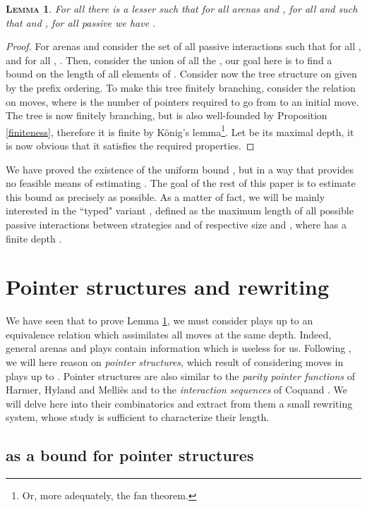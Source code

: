 \documentclass{article}
\newtheorem{lemma}{\textsc{Lemma}}
\begin{document}
\begin{lemma}
For all  there is a lesser  such that for all arenas  and , for all  and  such that
 and , for all passive  we have .
\label{konig}
\end{lemma}
\begin{proof}
For arenas  and  consider the set  of all passive interactions  such that for all ,
 and for all , . Then, consider the union  of all the , our goal
here is to find a bound on the length of all elements of . Consider now the tree structure on  given by the prefix ordering.
To make this tree finitely branching, consider the relation  on moves, where  is the number of pointers required
to go from  to an initial move. The tree  is now finitely branching, but is also well-founded by Proposition \ref{finiteness}, therefore it is finite by
König's lemma\footnote{Or, more adequately, the fan theorem.}. Let  be its maximal depth, it is now obvious that it satisfies the required properties.
\end{proof}

We have proved the existence of the uniform bound , but in a way that provides no feasible means of estimating . The goal of the rest of this
paper is to estimate this bound as precisely as possible. As a matter of fact, we will be mainly interested in the ``typed" variant , defined as the maximum
length of all possible passive interactions between strategies  and  of respective size  and , where  has a finite depth .


\section{Pointer structures and rewriting}
We have seen that to prove Lemma \ref{konig}, we must consider plays up to an equivalence relation  which assimilates all moves at the same depth. Indeed,
general arenas and plays contain information which is useless for us. Following \cite{totality}, we will here reason on
\emph{pointer structures}, which result of considering moves in plays up to .  Pointer structures are also similar to the \emph{parity pointer functions} of
Harmer, Hyland and Melliès \cite{hhm} and to the \emph{interaction sequences} of Coquand \cite{coquand}. We will delve here into their combinatorics and extract from them a small rewriting system,
whose study is sufficient to characterize their length.

\subsection{ as a bound for pointer structures}
\end{document}
